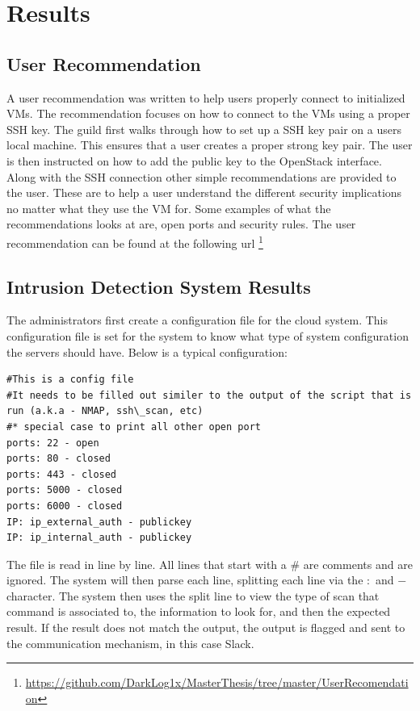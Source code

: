 \documentclass[12pt]{article}
\begin{document}
\section{Results}

\subsection{User Recommendation}
A user recommendation was written to help users properly connect to initialized VMs. The recommendation focuses on how to connect to the VMs using a proper SSH key. The guild first walks through how to set up a SSH key pair on a users local machine. This ensures that a user creates a proper strong key pair. The user is then instructed on how to add the public key to the OpenStack interface. Along with the SSH connection other simple recommendations are provided to the user. These are to help a user understand the different security implications no matter what they use the VM for. Some examples of what the recommendations looks at are, open ports and security rules. The user recommendation can be found at the following url \footnote{\href{https://github.com/DarkLog1x/MasterThesis/tree/master/UserRecomendation}{https://github.com/DarkLog1x/MasterThesis/tree/master/UserRecomendation}}

\newpage
\subsection{Intrusion Detection System Results}
The administrators first create a configuration file for the cloud system. This configuration file is set for the system to know what type of system configuration the servers should have. Below is a typical configuration:

\begin{mdframed}
    \begin{lstlisting}
#This is a config file
#It needs to be filled out similer to the output of the script that is run (a.k.a - NMAP, ssh\_scan, etc)
#* special case to print all other open port
ports: 22 - open
ports: 80 - closed
ports: 443 - closed
ports: 5000 - closed
ports: 6000 - closed
IP: ip_external_auth - publickey
IP: ip_internal_auth - publickey
    \end{lstlisting}
\end{mdframed}
The file is read in line by line. All lines that start with a \# are comments and are ignored. The system will then parse each line, splitting each line via the $:$ and $-$ character. The system then uses the split line to view the type of scan that command is associated to, the information to look for, and then the expected result. If the result does not match the output, the output is flagged and sent to the communication mechanism, in this case Slack.
\end{document}
